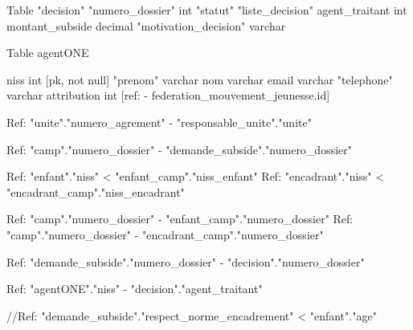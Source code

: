 Table "decision" {
  "numero_dossier" int
  "statut" "liste_decision"
  agent_traitant int
  montant_subside decimal
  "motivation_decision" varchar
}


Table agentONE {
  niss int [pk, not null]
  "prenom" varchar
  nom varchar
  email varchar
  "telephone" varchar
  attribution int [ref: - federation_mouvement_jeunesse.id]
  
}


Ref: "unite"."numero_agrement" - "responsable_unite"."unite"

Ref: "camp"."numero_dossier" - "demande_subside"."numero_dossier"

Ref: "enfant"."niss" < "enfant_camp"."niss_enfant"
Ref: "encadrant"."niss" < "encadrant_camp"."niss_encadrant"

Ref: "camp"."numero_dossier" - "enfant_camp"."numero_dossier"
Ref: "camp"."numero_dossier" - "encadrant_camp"."numero_dossier"


Ref: "demande_subside"."numero_dossier" - "decision"."numero_dossier"

Ref: "agentONE"."niss" - "decision"."agent_traitant"

//Ref: "demande_subside"."respect_norme_encadrement" < "enfant"."age"